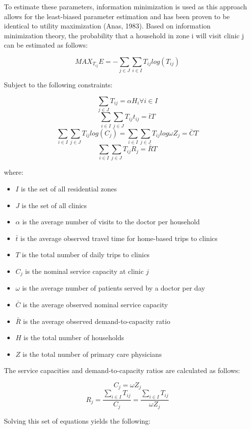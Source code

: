 \documentclass[]{elsarticle} %
\providecommand{\tightlist}{%
  \setlength{\itemsep}{0pt}\setlength{\parskip}{0pt}}
\begin{document}
To estimate these parameters, information minimization is used as this
approach allows for the least-biased parameter estimation and has been
proven to be identical to utility maximization (Anas, 1983). Based on
information minimization theory, the probability that a household in
zone i will visit clinic j can be estimated as follows:

\[
MAX_{T_{ij}} E = -\sum_{j \in J} \sum_{i \in I} T_{ij} log(T_{ij})
\]

Subject to the following constraints:

\[
\sum_{j \in J}T_{ij} = \alpha H_i \forall i \in I 
\] \[
\sum_{i \in I} \sum_{j \in J} T_{ij} t_{ij} = \bar{t}T 
\] \[
\sum_{i \in I} \sum_{j \in J} T_{ij} log(C_j) = \sum_{i \in I} \sum_{j \in J}T_{ij} log \omega Z_j = \bar{C}T 
\] \[
\sum_{i \in I} \sum_{j \in J} T_{ij} R_j = \bar{R}T
\]

where:

\begin{itemize}
\tightlist
\item
  \(I\) is the set of all residential zones
\item
  \(J\) is the set of all clinics
\item
  \(\alpha\) is the average number of visits to the doctor per household
\item
  \(\bar{t}\) is the average observed travel time for home-based trips
  to clinics
\item
  \(T\) is the total number of daily trips to clinics
\item
  \(C_j\) is the nominal service capacity at clinic \(j\)
\item
  \(\omega\) is the average number of patients served by a doctor per
  day
\item
  \(\bar{C}\) is the average observed nominal service capacity
\item
  \(\bar{R}\) is the average observed demand-to-capacity ratio
\item
  \(H\) is the total number of households
\item
  \(Z\) is the total number of primary care physicians
\end{itemize}

The service capacities and demand-to-capacity ratios are calculated as
follows:

\[
C_j = \omega Z_j
\] \[
R_j = \frac{\sum_{i \in I} T_{ij}}{C_j} = \frac{\sum_{i \in I} T_{ij}}{\omega Z_j}
\]

Solving this set of equations yields the following:
\end{document}
